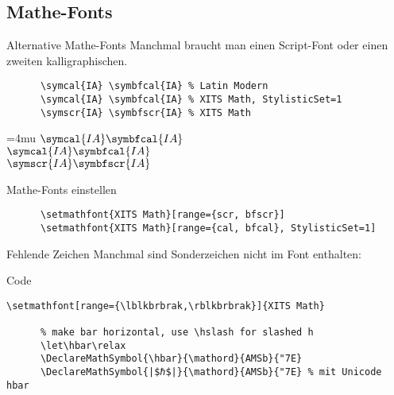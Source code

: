 \subsection{Mathe-Fonts}\label{sec:mathfonts}

\begin{frame}[fragile]{Alternative Mathe-Fonts}
  Manchmal braucht man einen Script-Font oder einen zweiten kalligraphischen.
  \vspace{1em}
  \begin{CodeExample}{0.83}
    \begin{lstlisting}
      \symcal{IA} \symbfcal{IA} % Latin Modern
      \symcal{IA} \symbfcal{IA} % XITS Math, StylisticSet=1
      \symscr{IA} \symbfscr{IA} % XITS Math
    \end{lstlisting}
  \CodeResult
    \Umathordordspacing\textstyle=4mu
                           $\symcal{I A} \symbfcal{I A}$ \\
    { $\symcal{I A} \symbfcal{I A}$} \\
    {    $\symscr{I A} \symbfscr{I A}$}
  \end{CodeExample}

  \begin{block}{Mathe-Fonts einstellen}
    \begin{lstlisting}
      \setmathfont{XITS Math}[range={scr, bfscr}]
      \setmathfont{XITS Math}[range={cal, bfcal}, StylisticSet=1]
    \end{lstlisting}
  \end{block}
\end{frame}

\begin{frame}[fragile]{Fehlende Zeichen}
  Manchmal sind Sonderzeichen nicht im Font enthalten:
  \vspace{1em}
  \begin{block}{Code}
    \begin{lstlisting}[escapechar=|]
      \setmathfont[range={\lblkbrbrak,\rblkbrbrak}]{XITS Math}

      % make bar horizontal, use \hslash for slashed h
      \let\hbar\relax
      \DeclareMathSymbol{\hbar}{\mathord}{AMSb}{"7E}
      \DeclareMathSymbol{|$ℏ$|}{\mathord}{AMSb}{"7E} % mit Unicode hbar
    \end{lstlisting}
  \end{block}
\end{frame}
